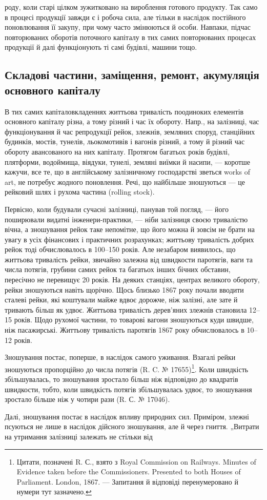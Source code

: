 \parcont{}  %
роду, коли старі цілком зужитковано на вироблення готового продукту. Так само в процесі продукції
завжди є і робоча сила, але тільки в наслідок постійного поновлювання її закупу, при чому часто
змінюються й особи. Навпаки, підчас повторюваних оборотів поточного капіталу в тих самих
повторюваних процесах продукції й далі функціонують ті самі будівлі, машини тощо.

\subsection{Складові частини, заміщення, ремонт, акумуляція основного капіталу}
В тих самих капіталовкладеннях життьова тривалість поодиноких елементів основного капіталу різна, а
тому різний і час їх обороту. Напр., на залізниці, час функціонування й час репродукції рейок,
злежнів, земляних споруд, станційних будинків, мостів, тунелів, льокомотивів і вагонів різний, а
тому й різний час обороту авансованого на них капіталу. Протягом багатьох років будівлі, плятформи,
водоймища, віядуки, тунелі,
земляні виїмки й насипи, — коротше кажучи, все те, що в англійському залізничному господарстві
зветься works of art, не потребує жодного поновлення. Речі, що найбільше зношуються — це рейковий
шлях і рухома частина (rolling stock).

Первісно, коли будували сучасні залізниці, панував той погляд, — його поширювали видатні
інженери-практики, — ніби залізниця своєю тривалістю вічна, а зношування рейок таке непомітне, що
його можна й зовсім не брати на увагу в усіх фінансових і практичних розрахунках; життьову
тривалість добрих рейок тоді обчислювалось в 100--150 років. Але незабаром виявилось, що життьова
тривалість рейки, звичайно залежна від швидкости паротягів, ваги та числа потягів, грубини самих
рейок та багатьох інших бічних обставин, пересічно не перевищує 20 років.
На деяких станціях, центрах великого обороту, рейки зношуються навіть щорічно. Щось близько 1867
року почали вводити сталеві рейки, які коштували майже вдвоє дорожче, ніж залізні, але зате й
тривають більш як удвоє. Життьова тривалість дерев’яних злежнів становила 12--15 років. Щодо рухомої
частини, то товарові вагони зношуються куди швидше, ніж пасажирські. Життьову тривалість паротягів
1867 року обчислювалось в 10--12 років.

Зношування постає, поперше, в наслідок самого уживання. Взагалі рейки зношуються пропорційно до
числа потягів (R. C. № \num{17655})\footnote{
Цитати, позначені R. С., взято з Royal Commission on Railways. Minutes of Evidence taken before
the Commissioners. Presented to both Houses of Parliament. London, 1867. — Запитання й відповіді
перенумеровано й нумери тут зазначено.
}. Коли швидкість збільшувалась, то зношування зростало більш ніж
відповідно до квадратів швидкости, тобто, коли швидкість потягів збільшувалась удвоє, то зношування
зростало більше ніж у чотири рази (R. С. № \num{17046}).

Далі, зношування постає в наслідок впливу природних сил. Приміром, злежні псуються не лише в
наслідок дійсного зношування, але й через гниття. „Витрати на утримання залізниці залежать не
стільки від
\parbreak{}  %
